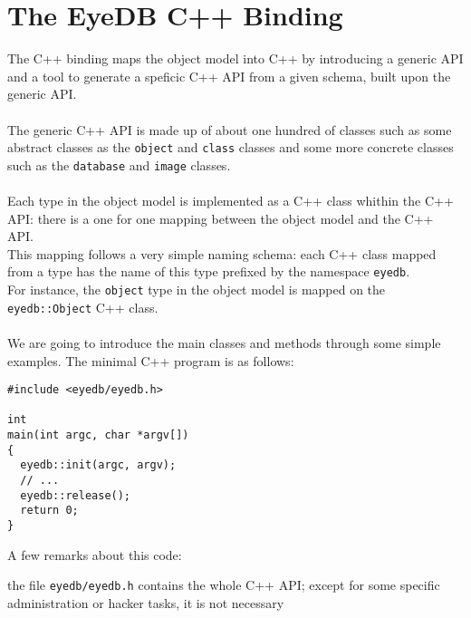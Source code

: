 

\newcommand{\mantitle}{\textsc{C++ Binding} }


\tableofcontents

\chapter{The EyeDB C++ Binding}

The C++ binding maps the \eyedb object model into C++ by introducing
a generic API
and a tool to generate a speficic C++ API from a given schema,
built upon the generic API.
\\
\\
The generic C++ API is made up of about one hundred of classes such
as some abstract classes as the \texttt{object} and \texttt{class} classes
and some more concrete classes such as the \texttt{database} and \texttt{image}
classes.
\\
\\
Each type in the \eyedb object model is implemented as a C++ class whithin
the C++ API: there is a one for one mapping between the object model and
the C++ API.
\\
This mapping follows a very simple naming schema: each C++ class mapped from
a type has the name of this type prefixed by the namespace \texttt{eyedb}.
\\
For instance, the \texttt{object} type in the \eyedb object model is
mapped on the \texttt{eyedb::Object} C++ class.
\\
\\
We are going to introduce the main classes and methods through some simple
examples.
The minimal \eyedb C++ program is as follows:
\verbsize
\begin{verbatim}
#include <eyedb/eyedb.h>

int
main(int argc, char *argv[])
{
  eyedb::init(argc, argv);
  // ...
  eyedb::release();
  return 0;
}
\end{verbatim}
\normalsize
A few remarks about this code:
\be
\item the file \texttt{eyedb/eyedb.h} contains the whole \eyedb C++ API; except
for some specific administration or hacker tasks, it is not necessary
